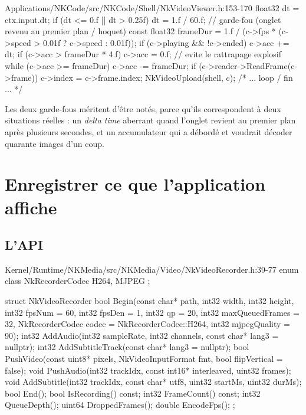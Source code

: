 \begin{nkcode}{Applications/NKCode/src/NKCode/Shell/NkVideoViewer.h:153-170}
            float32 dt = ctx.input.dt;
            if (dt <= 0.f || dt > 0.25f)
                dt = 1.f / 60.f; // garde-fou (onglet revenu au premier plan / hoquet)
            const float32 frameDur = 1.f / (c->fps * (c->speed > 0.01f ? c->speed : 0.01f));
            if (c->playing && !c->ended) {
                c->acc += dt;
                if (c->acc > frameDur * 4.f)
                    c->acc = 0.f; // evite le rattrapage explosif
                while (c->acc >= frameDur) {
                    c->acc -= frameDur;
                    if (c->reader->ReadFrame(c->frame)) {
                        c->index = c->frame.index;
                        NkVideoUpload(shell, c);
                    }
                    /* ... loop / fin ... */
                }
            }
\end{nkcode}

Les deux garde-fous méritent d'être notés, parce qu'ils correspondent à deux
situations réelles : un \emph{delta time} aberrant quand l'onglet revient au
premier plan après plusieurs secondes, et un accumulateur qui a débordé et
voudrait décoder quarante images d'un coup.

\section{Enregistrer ce que l'application affiche}

\subsection{L'API}

\begin{nkcode}{Kernel/Runtime/NKMedia/src/NKMedia/Video/NkVideoRecorder.h:39-77}
enum class NkRecorderCodec { H264, MJPEG };

struct NkVideoRecorder {
        bool Begin(const char* path, int32 width, int32 height, int32 fpsNum = 60, int32 fpsDen = 1,
                   int32 qp = 20, int32 maxQueuedFrames = 32,
                   NkRecorderCodec codec = NkRecorderCodec::H264, int32 mjpegQuality = 90);
        int32 AddAudio(int32 sampleRate, int32 channels, const char* lang3 = nullptr);
        int32 AddSubtitleTrack(const char* lang3 = nullptr);
        bool PushVideo(const uint8* pixels, NkVideoInputFormat fmt, bool flipVertical = false);
        void PushAudio(int32 trackIdx, const int16* interleaved, uint32 frames);
        void AddSubtitle(int32 trackIdx, const char* utf8, uint32 startMs, uint32 durMs);
        bool End();
        bool IsRecording() const;  int32 FrameCount() const;
        int32 QueueDepth();  uint64 DroppedFrames();  double EncodeFps();
};
\end{nkcode}

